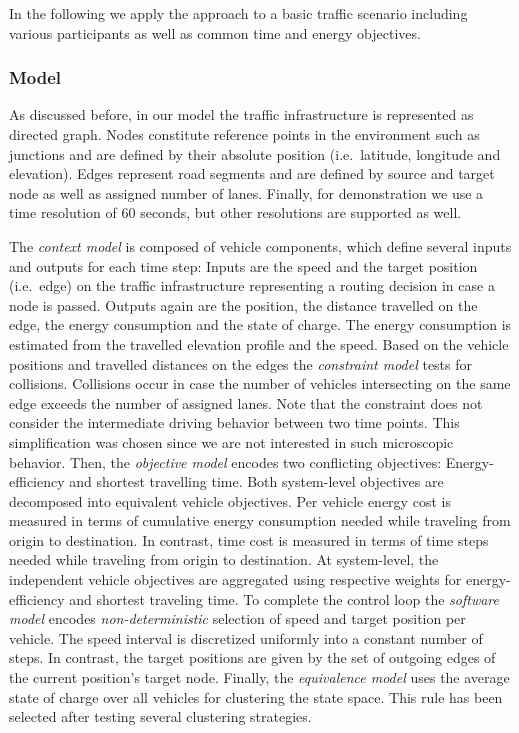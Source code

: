 \documentclass[conference]{../cls/IEEEtran}
\begin{document}
In the following we apply the approach to a basic traffic scenario including various participants as well as common time and energy objectives.

\subsubsection*{Model}

As discussed before, in our model the traffic infrastructure is represented as directed graph. Nodes constitute reference points in the environment such as junctions and are defined by their absolute position (i.e.\ latitude, longitude and elevation). Edges represent road segments and are defined by source and target node as well as assigned number of lanes. Finally, for demonstration we use a time resolution of 60 seconds, but other resolutions are supported as well.

The \textit{context model} is composed of vehicle components, which define several inputs and outputs for each time step: Inputs are the speed and the target position (i.e.\ edge) on the traffic infrastructure representing a routing decision in case a node is passed. Outputs again are the position, the distance travelled on the edge, the energy consumption and the state of charge. The energy consumption is estimated from the travelled elevation profile and the speed. Based on the vehicle positions and travelled distances on the edges the \textit{constraint model} tests for collisions. Collisions occur in case the number of vehicles intersecting on the same edge exceeds the number of assigned lanes. Note that the constraint does not consider the intermediate driving behavior between two time points. This simplification was chosen since we are not interested in such microscopic behavior. Then, the \textit{objective model} encodes two conflicting objectives: Energy-efficiency and shortest travelling time. Both system-level objectives are decomposed into equivalent vehicle objectives. Per vehicle energy cost is measured in terms of cumulative energy consumption needed while traveling from origin to destination. In contrast, time cost is measured in terms of time steps needed while traveling from origin to destination. At system-level, the independent vehicle objectives are aggregated using respective weights for energy-efficiency and shortest traveling time. To complete the control loop the \textit{software model} encodes \textit{non-deterministic} selection of speed and target position per vehicle. The speed interval is discretized uniformly into a constant number of steps. In contrast, the target positions are given by the set of outgoing edges of the current position's target node. Finally, the \textit{equivalence model} uses the average state of charge over all vehicles for clustering the state space. This rule has been selected after testing several clustering strategies.
\end{document}
